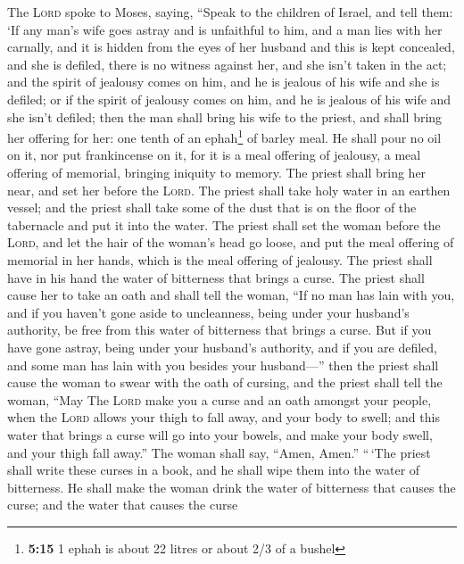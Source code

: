  The \textsc{Lord} spoke to Moses, saying,
 ``Speak to the children of Israel, and tell them: `If
any man's wife goes astray and is unfaithful to him,  and
a man lies with her carnally, and it is hidden from the eyes of her
husband and this is kept concealed, and she is defiled, there is no
witness against her, and she isn't taken in the act;  and
the spirit of jealousy comes on him, and he is jealous of his wife and
she is defiled; or if the spirit of jealousy comes on him, and he is
jealous of his wife and she isn't defiled;  then the man
shall bring his wife to the priest, and shall bring her offering for
her: one tenth of an ephah\footnote{\textbf{5:15} 1 ephah is about 22
  litres or about 2/3 of a bushel} of barley meal. He shall pour no oil
on it, nor put frankincense on it, for it is a meal offering of
jealousy, a meal offering of memorial, bringing iniquity to memory.
 The priest shall bring her near, and set her before the
\textsc{Lord}.  The priest shall take holy water in an
earthen vessel; and the priest shall take some of the dust that is on
the floor of the tabernacle and put it into the water. 
The priest shall set the woman before the \textsc{Lord}, and let the
hair of the woman's head go loose, and put the meal offering of memorial
in her hands, which is the meal offering of jealousy. The priest shall
have in his hand the water of bitterness that brings a curse.
 The priest shall cause her to take an oath and shall
tell the woman, ``If no man has lain with you, and if you haven't gone
aside to uncleanness, being under your husband's authority, be free from
this water of bitterness that brings a curse.  But if you
have gone astray, being under your husband's authority, and if you are
defiled, and some man has lain with you besides your husband---''
 then the priest shall cause the woman to swear with the
oath of cursing, and the priest shall tell the woman, ``May The
\textsc{Lord} make you a curse and an oath amongst your people, when the
\textsc{Lord} allows your thigh to fall away, and your body to swell;
 and this water that brings a curse will go into your
bowels, and make your body swell, and your thigh fall away.'' The woman
shall say, ``Amen, Amen.''  ``\,`The priest shall write
these curses in a book, and he shall wipe them into the water of
bitterness.  He shall make the woman drink the water of
bitterness that causes the curse; and the water that causes the curse
